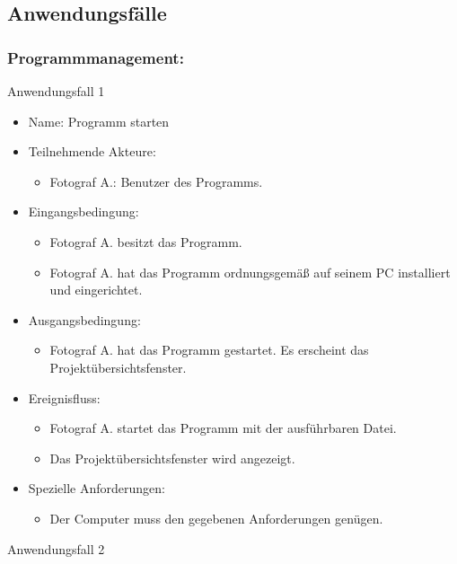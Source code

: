 \subsection{Anwendungsfälle}

	\subsubsection{Programmmanagement:}
	
	\begin{description}
	\item[Anwendungsfall 1]
	\end{description}
	
	\begin{itemize}
		\item Name: Programm starten
		\item Teilnehmende Akteure:
		\begin{itemize}
			\item	Fotograf A.: Benutzer des Programms.
		\end{itemize}
		\item Eingangsbedingung:
		\begin{itemize}
			\item Fotograf A. besitzt das Programm.
			\item Fotograf A. hat das Programm ordnungsgemäß auf seinem PC installiert und eingerichtet.						
		\end{itemize}
		\item Ausgangsbedingung:
		\begin{itemize}
			\item	Fotograf A. hat das Programm gestartet. Es erscheint das Projektübersichtsfenster.		
		\end{itemize}
		\item Ereignisfluss:	
		\begin{itemize}
			\item Fotograf A. startet das Programm mit der ausführbaren Datei.		
			\item Das Projektübersichtsfenster wird angezeigt.
		\end{itemize}
		\item Spezielle Anforderungen:
		\begin{itemize}
			\item	Der Computer muss den gegebenen Anforderungen genügen.
		\end{itemize}
	\end{itemize}
	
	\begin{description}
	\item[Anwendungsfall 2]
	\end{description}
	
